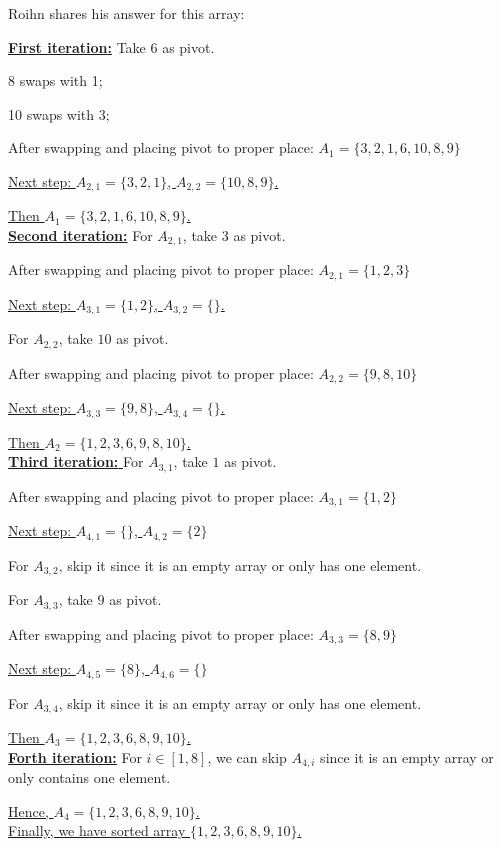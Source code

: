 \documentclass[11pt]{exam}
\begin{document}
Roihn shares his answer for this array:
\begin{solution}

\underline{\textbf{First iteration:}} Take $6$ as pivot. 

8 swaps with 1;

10 swaps with 3;

After swapping and placing pivot to proper place: $A_1 = \{3, 2, 1, 6, 10, 8, 9\}$

\underline{Next step: $A_{2,1} = \{3,2,1\}$, $A_{2,2} = \{10,8,9\}$.}

\underline{Then $A_1 = \{3,2,1,6,10,8,9\}$.}\\

\underline{\textbf{Second iteration:}} For $A_{2,1}$, take $3$ as pivot.

After swapping and placing pivot to proper place: $A_{2,1} = \{1,2,3\}$

\underline{Next step: $A_{3,1} = \{1,2\}$, $A_{3,2} = \{\}$.}

For $A_{2,2}$, take $10$ as pivot.

After swapping and placing pivot to proper place: $A_{2,2} = \{9,8,10\}$

\underline{Next step: $A_{3,3} = \{9,8\}$, $A_{3,4} = \{\}$.}

\underline{Then $A_{2} = \{1,2,3,6,9,8,10\}$.}\\

\underline{\textbf{Third iteration: }}For $A_{3,1}$, take $1$ as pivot.

After swapping and placing pivot to proper place: $A_{3,1} = \{1,2\}$

\underline{Next step: $A_{4,1} = \{\}$, $A_{4,2} = \{2\}$}

For $A_{3,2}$, skip it since it is an empty array or only has one element.

For $A_{3,3}$, take $9$ as pivot.

After swapping and placing pivot to proper place: $A_{3,3} = \{8,9\}$

\underline{Next step: $A_{4,5} = \{8\}$, $A_{4,6} = \{\}$}

For $A_{3,4}$, skip it since it is an empty array or only has one element.

\underline{Then $A_{3} = \{1,2,3,6,8,9,10\}$.}\\

\underline{\textbf{Forth iteration:}}  For $i\in [1,8]$, we can skip $A_{4,i}$ since it is an empty array or only contains one element.

\underline{Hence, $A_{4} = \{1,2,3,6,8,9,10\}$.}\\

\underline{Finally, we have sorted array $\{1,2,3,6,8,9,10\}$.}
\end{solution}
\end{document}
